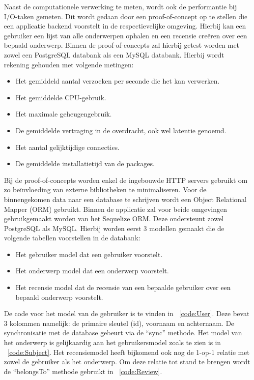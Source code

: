 Naast de computationele verwerking te meten, wordt ook de performantie bij I/O-taken gemeten.
Dit wordt gedaan door een proof-of-concept op te stellen die een applicatie backend voorstelt in de respectievelijke omgeving.
Hierbij kan een gebruiker een lijst van alle onderwerpen ophalen en een recensie creëren over een bepaald onderwerp. 
Binnen de proof-of-concepts zal hierbij getest worden met zowel een PostgreSQL databank als een MySQL databank.
Hierbij wordt rekening gehouden met volgende metingen:
\begin{itemize}
    \item Het gemiddeld aantal verzoeken per seconde die het kan verwerken.
    \item Het gemiddelde CPU-gebruik.
    \item Het maximale geheugengebruik.
    \item De gemiddelde vertraging in de overdracht, ook wel latentie genoemd.
    \item Het aantal gelijktijdige connecties.
    \item De gemiddelde installatietijd van de packages.
\end{itemize}
Bij de proof-of-concepts worden enkel de ingebouwde HTTP servers gebruikt om zo beïnvloeding van externe bibliotheken te minimaliseren.
Voor de binnengekomen data naar een database te schrijven wordt een Object Relational Mapper (ORM) gebruikt.
Binnen de applicatie zal voor beide omgevingen gebruikgemaakt worden van het Sequelize ORM. Deze ondersteunt zowel PostgreSQL als MySQL.
Hierbij worden eerst 3 modellen gemaakt die de volgende tabellen voorstellen in de databank:
\begin{itemize}
  \item Het gebruiker model dat een gebruiker voorstelt.
  \item Het onderwerp model dat een onderwerp voorstelt.
  \item Het recensie model dat de recensie van een bepaalde gebruiker over een bepaald onderwerp voorstelt.
\end{itemize}
De code voor het model van de gebruiker is te vinden in ~\ref{code:User}. Deze bevat 3 kolommen namelijk: de primaire sleutel (id), voornaam en achternaam.
De synchronisatie met de database gebeurt via de “sync” methode.
Het model van het onderwerp is gelijkaardig aan het gebruikersmodel zoals te zien is in ~\ref{code:Subject}. Het recensiemodel heeft bijkomend 
ook nog de 1-op-1 relatie met zowel de gebruiker als het onderwerp.
Om deze relatie tot stand te brengen wordt de “belongsTo” methode gebruikt in ~\ref{code:Review}. 
